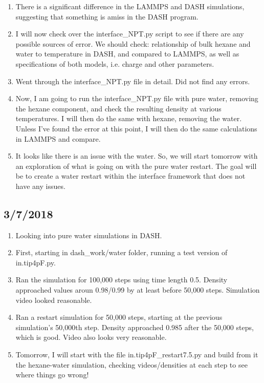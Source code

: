 \documentclass[12pt,reqno]{amsart}
\numberwithin{equation}{section}
\begin{document}
\begin{enumerate}
\item There is a significant difference in the LAMMPS and DASH simulations, suggesting that something is amiss in the DASH program.  

\item I will now check over the interface\_NPT.py script to see if there are any possible sources of error.  We should check: relationship of bulk hexane and water to temperature in DASH, and compared to LAMMPS, as well as specifications of both models, i.e. charge and other parameters.  

\item Went through the interface\_NPT.py file in detail.  Did not find any errors.

\item Now, I am going to run the interface\_NPT.py file with pure water, removing the hexane component, and check the resulting density at various temperatures.  I will then do the same with hexane, removing the water.  Unless I've found the error at this point, I will then do the same calculations in LAMMPS and compare.  

\item It looks like there is an issue with the water.  So, we will start tomorrow with an exploration of what is going on with the pure water restart.  The goal will be to create a water restart within the interface framework that does not have any issues.  

\end{enumerate}

\subsection{3/7/2018}
\begin{enumerate}
\item Looking into pure water simulations in DASH.  
\item First, starting in dash\_work/water folder, running a test version of in.tip4pF.py.  
\item Ran the simulation for 100,000 steps using time length 0.5.  Density approached values aroun 0.98/0.99 by at least before 50,000 steps.  Simulation video looked reasonable.    
\item Ran a restart simulation for 50,000 steps, starting at the previous simulation's 50,000th step.  Density approached 0.985 after the 50,000 steps, which is good.  Video also looks very reasonable.  
\item Tomorrow, I will start with the file in.tip4pF\_restart7.5.py and build from it the hexane-water simulation, checking videos/densities at each step to see where things go wrong!  
\end{enumerate}
\end{document}
